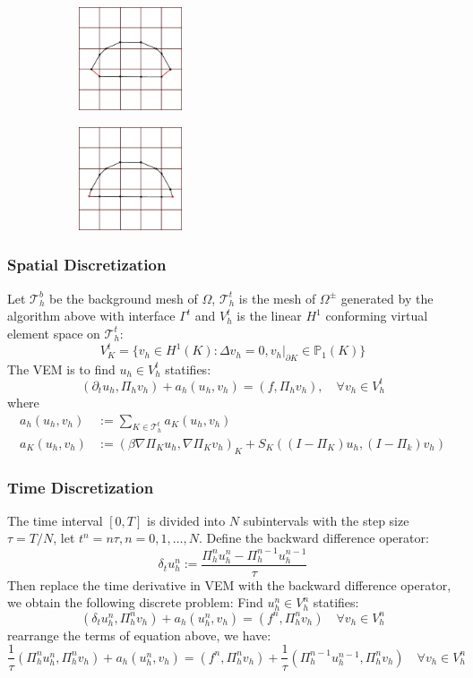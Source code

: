 \documentclass[notheorems,serif]{beamer}
\begin{document}
\begin{CJK}{UTF8}{gkai}
\begin{frame}
\begin{figure}[htbp]
\begin{subfigure}[t]{0.49\linewidth}
    \centering
    \includegraphics[width=1.2in]{../figures/movingmaxwell/cut_mesh_0.pdf}
\end{subfigure}
\begin{subfigure}[t]{0.49\linewidth}
    \centering
    \includegraphics[width=1.2in]{../figures/movingmaxwell/cut_mesh_1.pdf}
\end{subfigure}
\end{figure}

\end{frame}

\begin{frame}
    \frametitle{Spatial Discretization}
Let $\mathcal{T}_h^b$ be the background mesh of $\Omega$, 
$\mathcal{T}_h^t$ is the mesh of $\Omega^{\pm}$ generated
by the algorithm above with interface $\Gamma^t$ 
and $V_h^t$ is the linear $H^1$ conforming virtual element space on
$\mathcal{T}_h^t$:
$$
V_K^t = \{v_h \in H^1(K): \Delta v_h = 0, v_h|_{\partial K} \in
    \mathbb{P}_1(K)\}
$$
The VEM is to find $u_h \in V_h^t$ statifies:
$$
(\partial_t u_h, \Pi_hv_h) + a_h(u_h, v_h) = 
(f, \Pi_hv_h), \quad \forall
v_h \in V_h^t
$$
where
$$
\begin{aligned}
    a_h(u_h, v_h) & := \sum_{K\in \mathcal{T}_h^t} a_K(u_h, v_h)\\
    a_K(u_h, v_h) & := (\beta\nabla \Pi_K u_h, \nabla \Pi_K v_h)_{K}
+ S_K( (I-\Pi_K) u_h, (I-\Pi_k)v_h)
\end{aligned}
$$
\end{frame}

\begin{frame}
    \frametitle{Time Discretization}
The time interval $[0, T]$ is divided into $N$ subintervals with the step size 
$\tau = T/N$, let $t^n = n\tau, n = 0, 1, \dots, N$. 
Define the backward difference operator:
$$
\delta_t u_h^n := \frac{\Pi_h^{n}u_h^n - \Pi_h^{n-1} u_h^{n-1}}{\tau}
$$
Then replace the time derivative in VEM with the backward difference operator,
we obtain the following discrete problem: Find $u_h^n \in V_h^n$ statifies:
$$
(\delta_t u_h^n, \Pi_h^n v_h) + a_h(u_h^n, v_h) = (f^n,\Pi_h^n v_h)
\quad \forall v_h \in V_h^n
$$
rearrange the terms of equation above, we have: 
$$
\frac{1}{\tau}( \Pi_h^n u_h^n,\Pi_h^n v_h) + a_h(u_h^n, v_h) = 
(f^n, \Pi_h^n v_h) + \frac{1}{\tau}(\Pi_h^{n-1} u_h^{n-1},\Pi_h^n v_h)
\quad \forall v_h \in V_h^n
$$
\end{frame}


\end{CJK}
\end{document}
